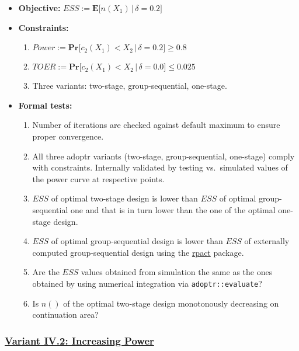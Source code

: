 \documentclass[
]{book}
\providecommand{\tightlist}{%
  \setlength{\itemsep}{0pt}\setlength{\parskip}{0pt}}
\begin{document}
\begin{itemize}
\tightlist
\item
  \textbf{Objective:} \(ESS := \boldsymbol{E}\big[n(X_1)\,|\,\delta=0.2\big]\)
\item
  \textbf{Constraints:}

  \begin{enumerate}
  \def\labelenumi{\arabic{enumi}.}
  \tightlist
  \item
    \(Power := \boldsymbol{Pr}\big[c_2(X_1) < X_2\,|\,\delta=0.2\big] \geq 0.8\)
  \item
    \(TOER := \boldsymbol{Pr}\big[c_2(X_1) < X_2\,|\,\delta=0.0\big] \leq 0.025\)
  \item
    Three variants: two-stage, group-sequential, one-stage.
  \end{enumerate}
\item
  \textbf{Formal tests:}

  \begin{enumerate}
  \def\labelenumi{\arabic{enumi}.}
  \tightlist
  \item
    Number of iterations are checked against default maximum to ensure proper
    convergence.
  \item
    All three adoptr variants (two-stage, group-sequential, one-stage)
    comply with constraints. Internally validated by testing vs.~simulated
    values of the power curve at respective points.
  \item
    \(ESS\) of optimal two-stage design is lower than \(ESS\) of optimal
    group-sequential one and that is in turn lower than the one of the
    optimal one-stage design.
  \item
    \(ESS\) of optimal group-sequential design is lower than \(ESS\) of
    externally computed group-sequential design using the \href{https://rpact.org/}{rpact} package.
  \item
    Are the \(ESS\) values obtained from simulation the same as the ones
    obtained by using numerical integration via \texttt{adoptr::evaluate}?
  \item
    Is \(n()\) of the optimal two-stage design monotonously decreasing on
    continuation area?
  \end{enumerate}
\end{itemize}

\hypertarget{variant-iv.2-increasing-power}{%
\subsubsection{\texorpdfstring{\protect\hyperlink{variantIV_2}{Variant IV.2: Increasing Power}}{Variant IV.2: Increasing Power}}\label{variant-iv.2-increasing-power}}
\end{document}
